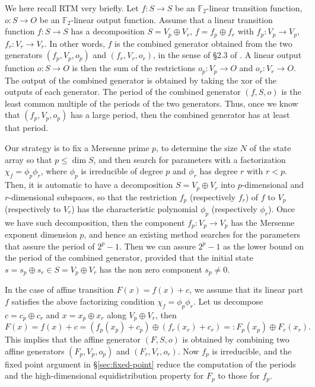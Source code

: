 \documentclass{svmult}
\begin{document}
We here recall RTM very briefly.
Let $f:S \to S$ be an ${\mathbb F}_2$-linear transition function,
$o:S \to O$ be an ${\mathbb F}_2$-linear output function.
Assume that
a linear transition function $f:S \to S$ has a decomposition
$S=V_p \oplus V_r$, $f=f_p \oplus f_r$ with $f_p:V_p \to V_p$,
$f_r:V_r \to V_r$. In other words, $f$ is the
combined generator obtained from the two generators
$(f_p, V_p, o_p)$ and $(f_r, V_r, o_r)$,
in the sense of \S2.3 of \cite{F2RNG-LEcuyer}. A linear output function
$o:S \to O$ is then the sum of the restrictions $o_p:V_p \to O$ and
$o_r:V_r \to O$. The output of the combined generator is obtained by
taking the xor of the outputs of each generator.
The period of the combined generator $(f,S,o)$ is the least common multiple
of the periods of the two generators. Thus, once we know that $(f_p,V_p,o_p)$ has a large
period, then the combined generator has at least that period.

Our strategy is to fix a Mersenne prime $p$, to determine the
size $N$ of the state array so that $p \leq \dim S$, and then
search for parameters with a factorization
$\chi_f=\phi_p \phi_r$, where $\phi_p$ is irreducible of degree $p$
and $\phi_r$ has degree $r$ with $r<p$. Then, it is automatic to have
a decomposition $S = V_p \oplus V_r$ into $p$-dimensional and
$r$-dimensional subspaces, so that the restriction
$f_p$ (respectively $f_r$) of $f$ to $V_p$ (respectively to $V_r$)
has the characteristic polynomial $\phi_p$ (respectively $\phi_r$).
Once we have such decomposition, then the component $f_p:V_p \to V_p$
has the Mersenne exponent dimension $p$,
and hence an existing method searches for the parameters that assure
the period of $2^p-1$. Then we can assure $2^p-1$ as the lower bound on the
period of the combined generator, provided that the initial state
$s = s_p \oplus s_r \in S = V_p \oplus V_r$ has the non zero component
$s_p \neq 0$.

In the case of affine transition $F(x)=f(x)+c$, we assume
that its linear part $f$ satisfies the above factorizing condition
$\chi_f=\phi_p\phi_r$.
Let us decompose $c=c_p\oplus c_r$ and $x=x_p\oplus x_r$
along $V_p\oplus V_r$, then
\begin{equation}\label{eq:decomp-F}
F(x)=f(x)+c=(f_p(x_p)+c_p) \oplus (f_r(x_r)+c_r)=:F_p(x_p)\oplus F_r(x_r).
\end{equation}
This implies that the affine generator $(F, S, o)$ is
obtained by combining two affine generators
$(F_p, V_p, o_p)$ and $(F_r, V_r, o_r)$.
Now $f_p$ is irreducible, and the fixed point argument in
\S\ref{sec:fixed-point} reduce the computation of the periods
and the high-dimensional equidistribution property for $F_p$
to those for $f_p$.
\end{document}
